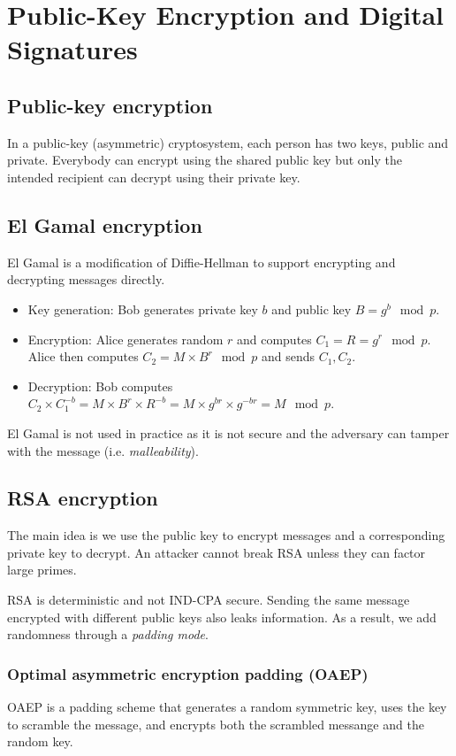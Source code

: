 \chapter{Public-Key Encryption and Digital Signatures}

\section{Public-key encryption}
In a public-key (asymmetric) cryptosystem, each person has two keys, public and private. Everybody can encrypt using the shared public key but only the intended recipient can decrypt using their private key.

\section{El Gamal encryption}
El Gamal is a modification of Diffie-Hellman to support encrypting and decrypting messages directly.
\begin{itemize}
    \item Key generation: Bob generates private key $b$ and public key $B = g^b \mod p$.
    \item Encryption: Alice generates random $r$ and computes $C_1 = R = g^r \mod p$. Alice then computes $C_2 = M \times B^r \mod p$ and sends $C_1, C_2$.
    \item Decryption: Bob computes $C_2 \times C_1^{-b} = M \times B^r \times R^{-b} = M \times g^{br} \times g^{-br} = M \mod p$.
\end{itemize}

\medskip

El Gamal is not used in practice as it is not secure and the adversary can tamper with the message (i.e. \emph{malleability}).

\section{RSA encryption}
The main idea is we use the public key to encrypt messages and a corresponding private key to decrypt. An attacker cannot break RSA unless they can factor large primes.

\medskip
RSA is deterministic and not IND-CPA secure.  Sending the same message encrypted with different public keys also leaks information. As a result, we add randomness through a \emph{padding mode}.

\subsection{Optimal asymmetric encryption padding (OAEP)}
OAEP is a padding scheme that generates a random symmetric key, uses the key to scramble the message, and encrypts both the scrambled messange and the random key. 

